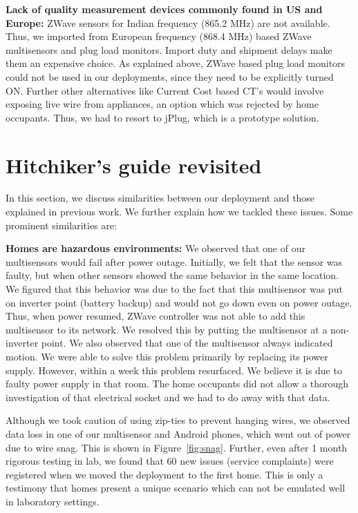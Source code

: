 \documentclass[10pt]{sensys-proc}
\newcommand{\figref}[1]{Figure~\ref{#1}}
\begin{document}
\noindent \textbf{Lack of quality measurement devices commonly found in US and Europe:} ZWave sensors for Indian frequency (865.2 MHz) are not available. Thus, we imported from European frequency (868.4 MHz) based ZWave multisensors and plug load monitors. Import duty and shipment delays make them an expensive choice. As explained above, ZWave based plug load monitors could not be used in our deployments, since they need to be explicitly turned ON. Further other alternatives like Current Cost based CT's would involve exposing live wire from appliances, an option which was rejected by home occupants. Thus, we had to resort to jPlug, which is a prototype solution.

\section{Hitchiker's guide revisited}
\label{sec:common}
In this section, we discuss similarities between our deployment and those explained in previous work. We further explain how we tackled these issues. Some prominent similarities are:

\noindent \textbf{Homes are hazardous environments:} We observed that one of our multisensors would fail after power outage. Initially, we felt that the sensor was faulty, but when other sensors showed the same behavior in the same location. We figured that this behavior was due to the fact that this multisensor was put on inverter point (battery backup) and would not go down even on power outage. Thus, when power resumed, ZWave controller was not able to add this multisensor to its network. We resolved this by putting the multisensor at a non-inverter point. We also observed that one of the multisensor always indicated motion. We were able to solve this problem primarily by replacing its power supply. However, within a week this problem resurfaced. We believe it is due to faulty power supply in that room. The home occupants did not allow a thorough investigation of that electrical socket and we had to do away with that data.

\noindent Although we took caution of using zip-ties to prevent hanging wires, we observed data loss in one of our multisensor and Android phones, which went out of power due to wire snag. This is shown in \figref{fig:snag}. Further, even after 1 month rigorous testing in lab, we found that 60 new issues (service complaints) were registered when we moved the deployment to the first home. This is only a testimony that homes present a unique scenario which can not be emulated well in laboratory settings.
\end{document}
